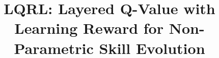 \documentclass{article}
\title{LQRL: Layered Q-Value with Learning Reward for Non-Parametric Skill Evolution}
\theoremstyle{plain}
\theoremstyle{definition}
\theoremstyle{remark}
\begin{document}
\maketitle

\begin{abstract}

\end{abstract}










\newpage
\appendix

\end{document}
